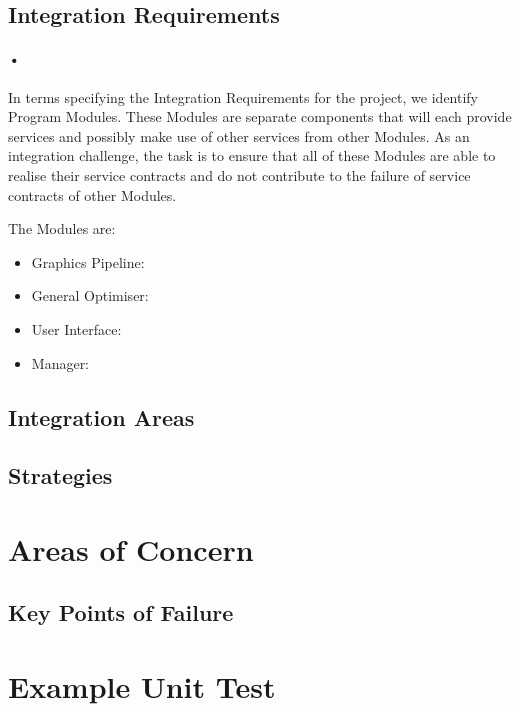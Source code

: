 \documentclass[11pt]{article}
\begin{document}
\subsection{Integration Requirements}
\paragraph{•}
In terms specifying the Integration Requirements for the project, we identify Program Modules. These Modules are separate components that will each provide services and possibly make use of other services from other Modules. As an integration challenge, the task is to ensure that all of these Modules are able to realise their service contracts and do not contribute to the failure of service contracts of other Modules.

The Modules are:
\begin{itemize}
\item Graphics Pipeline:
\item General Optimiser:
\item User Interface:
\item Manager:
\end{itemize}
 
\subsection{Integration Areas}
\subsection{Strategies}

\section{Areas of Concern}
\subsection{Key Points of Failure}
\lipsum

\section{Example Unit Test}
\end{document}
